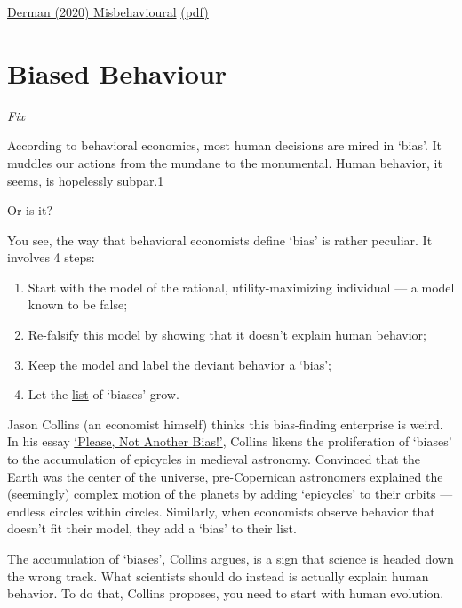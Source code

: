 \documentclass[
]{book}
\providecommand{\tightlist}{%
  \setlength{\itemsep}{0pt}\setlength{\parskip}{0pt}}
\begin{document}
\href{http://emanuelderman.com/misbehavioral-psychology/}{Derman (2020) Misbehavioural}
\href{pdf/Derman_2020_Misbehvioural_FAZ.pdf}{(pdf)}

\hypertarget{biased-behaviour}{%
\section{Biased Behaviour}\label{biased-behaviour}}

\emph{Fix}

According to behavioral economics, most human decisions are mired in `bias'. It muddles our actions from the mundane to the monumental. Human behavior, it seems, is hopelessly subpar.1

Or is it?

You see, the way that behavioral economists define `bias' is rather peculiar. It involves 4 steps:

\begin{enumerate}
\def\labelenumi{\arabic{enumi}.}
\tightlist
\item
  Start with the model of the rational, utility-maximizing individual --- a model known to be false;
\item
  Re-falsify this model by showing that it doesn't explain human behavior;
\item
  Keep the model and label the deviant behavior a `bias';
\item
  Let the \href{https://en.wikipedia.org/wiki/List_of_cognitive_biases}{list} of `biases' grow.
\end{enumerate}

Jason Collins (an economist himself) thinks this bias-finding enterprise is weird.
In his essay \href{https://evonomics.com/please-not-another-bias-the-problem-with-behavioral-economics/}{`Please, Not Another Bias!'}, Collins likens the proliferation of `biases' to the accumulation of epicycles in medieval astronomy. Convinced that the Earth was the center of the universe, pre-Copernican astronomers explained the (seemingly) complex motion of the planets by adding `epicycles' to their orbits --- endless circles within circles. Similarly, when economists observe behavior that doesn't fit their model, they add a `bias' to their list.

The accumulation of `biases', Collins argues, is a sign that science is headed down the wrong track. What scientists should do instead is actually explain human behavior. To do that, Collins proposes, you need to start with human evolution.
\end{document}
